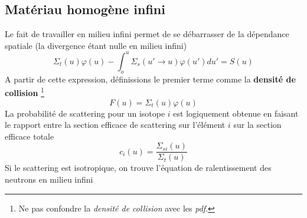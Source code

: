 	 
	 
	 
	\subsection{Matériau homogène infini}
	Le fait de travailler en milieu infini permet de se débarrasser de la dépendance spatiale (la 
	divergence étant nulle en milieu infini)
	\begin{equation}
	{\Sigma _t}(u)\varphi (u) - \int_o^u    {\Sigma _s}(u' \to u)\varphi (u')du' = S(u)
	\end{equation}
	A partir de cette expression, définissions le premier terme comme la \textbf{densité de collision}
	\footnote{Ne pas confondre la \textit{densité de collision} avec les \textit{pdf}.} 
	\begin{equation}
	F(u) = {\Sigma _t}(u)\varphi (u)
	\end{equation}
	La probabilité de scattering pour un isotope $i$ est logiquement obtenue en faisant le rapport 
	entre la section efficace de scattering sur l'élément $i$ sur la section efficace totale
	\begin{equation}
	{c_i}(u) = \frac{{{\Sigma _{si}}(u)}}{{{\Sigma _t}(u)}}
	\end{equation}
	Si le scattering est isotropique, on trouve l'équation de ralentissement des neutrons en 
	milieu infini\ \\
	
